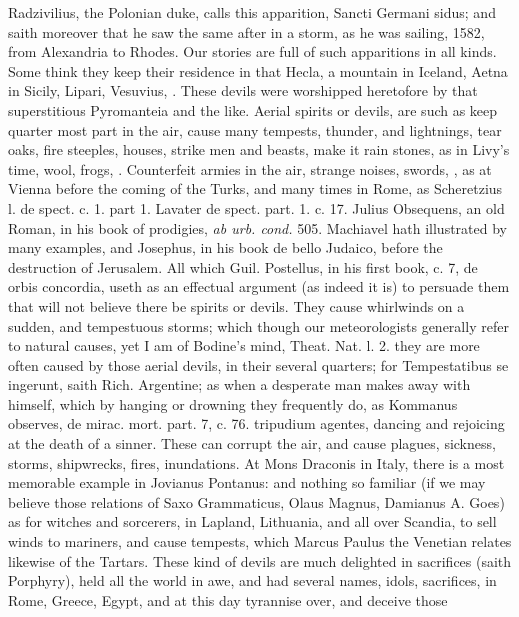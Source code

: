 {Radzivilius, the Polonian duke, calls this apparition, Sancti Germani
sidus; and saith moreover that he saw the same after in a storm, as he
was sailing, 1582, from Alexandria to Rhodes. Our stories are
full of such apparitions in all kinds. Some think they keep their
residence in that Hecla, a mountain in Iceland, Aetna in Sicily,
Lipari, Vesuvius, \etc{}. These devils were worshipped heretofore by that
superstitious Pyromanteia and the like.
Aerial spirits or devils, are such as keep quarter most part in the
 air, cause many tempests, thunder, and lightnings, tear oaks,
fire steeples, houses, strike men and beasts, make it rain stones, as
in Livy's time, wool, frogs, \etc{}. Counterfeit armies in the air, strange
noises, swords, \etc{}, as at Vienna before the coming of the Turks, and
many times in Rome, as Scheretzius l. de spect. c. 1. part 1. Lavater
de spect. part. 1. c. 17. Julius Obsequens, an old Roman, in his book
of prodigies, \emph{ab urb. cond.} 505. Machiavel hath illustrated by
many examples, and Josephus, in his book de bello Judaico, before the
destruction of Jerusalem. All which Guil. Postellus, in his first book,
c. 7, de orbis concordia, useth as an effectual argument (as indeed it
is) to persuade them that will not believe there be spirits or devils.
They cause whirlwinds on a sudden, and tempestuous storms; which though
our meteorologists generally refer to natural causes, yet I am of
Bodine's mind, Theat. Nat. l. 2. they are more often caused by those
aerial devils, in their several quarters; for Tempestatibus se
ingerunt, saith  Rich. Argentine; as when a desperate man makes
away with himself, which by hanging or drowning they frequently do, as
Kommanus observes, de mirac. mort. part. 7, c. 76. tripudium agentes,
dancing and rejoicing at the death of a sinner. These can corrupt the
air, and cause plagues, sickness, storms, shipwrecks, fires,
inundations. At Mons Draconis in Italy, there is a most memorable
example in Jovianus Pontanus: and nothing so familiar (if we may
believe those relations of Saxo Grammaticus, Olaus Magnus, Damianus A.
Goes) as for witches and sorcerers, in Lapland, Lithuania, and all over
Scandia, to sell winds to mariners, and cause tempests, which Marcus
Paulus the Venetian relates likewise of the Tartars. These kind of
devils are much delighted in sacrifices (saith Porphyry), held
all the world in awe, and had several names, idols, sacrifices, in
Rome, Greece, Egypt, and at this day tyrannise over, and deceive those
}
